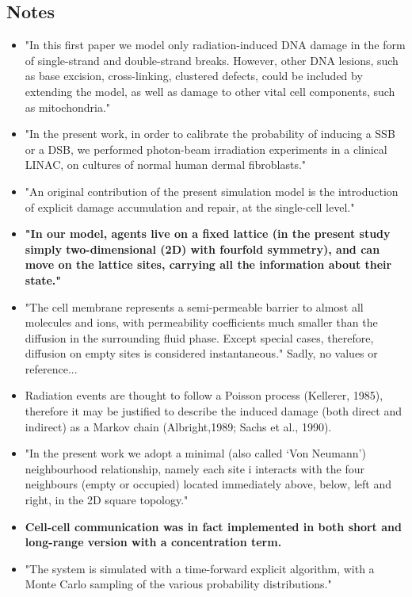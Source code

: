 \documentclass[11pt,a4paper]{article}
\begin{document}
\subsection*{Notes}
\begin{itemize}
\item "In this first paper we model only radiation-induced DNA damage in the form of single-strand and double-strand
breaks. However, other DNA lesions, such as base excision, cross-linking, clustered defects, could be included by extending the model, as well as damage to other vital cell components, such as mitochondria."
\item "In the present work, in order to calibrate the probability of inducing a SSB or a DSB, we performed photon-beam irradiation experiments in a clinical LINAC, on cultures of normal human dermal fibroblasts."
\item "An original contribution of the present simulation model is the introduction of explicit damage accumulation and repair, at the single-cell level."
\item \textbf{"In our model, agents live on a fixed lattice (in the present study simply two-dimensional (2D) with fourfold symmetry), and can move on the lattice sites, carrying all the information about their state."}
\item "The cell membrane represents a semi-permeable barrier to almost all molecules and ions, with permeability coefficients much smaller than the diffusion in the surrounding fluid phase. Except special cases, therefore, diffusion on empty sites is considered instantaneous." Sadly, no values or reference...
\item Radiation events are thought to follow a Poisson process (Kellerer, 1985), therefore it may be justified to describe the induced damage (both direct and indirect) as a Markov chain (Albright,1989; Sachs et al., 1990).
\item "In the present work we adopt a minimal (also called ‘Von Neumann’) neighbourhood relationship, namely each site i interacts with the four neighbours (empty or occupied) located immediately above, below, left and right, in the 2D square topology."
\item \textbf{Cell-cell communication was in fact implemented in both short and long-range version with a concentration term.}
\item "The system is simulated with a time-forward explicit algorithm, with a Monte Carlo sampling of the various probability distributions."
\end{itemize}
\end{document}
